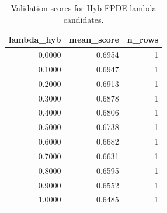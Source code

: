 \begin{table}[t]
\caption{Validation scores for Hyb-FPDE lambda candidates.}
\label{tab:lambda_distribution_computed}
\centering
\begin{tabular}{rrr}
\toprule
lambda\_hyb & mean\_score & n\_rows \\
\midrule
0.0000 & 0.6954 & 1 \\
0.1000 & 0.6947 & 1 \\
0.2000 & 0.6913 & 1 \\
0.3000 & 0.6878 & 1 \\
0.4000 & 0.6806 & 1 \\
0.5000 & 0.6738 & 1 \\
0.6000 & 0.6682 & 1 \\
0.7000 & 0.6631 & 1 \\
0.8000 & 0.6595 & 1 \\
0.9000 & 0.6552 & 1 \\
1.0000 & 0.6485 & 1 \\
\bottomrule
\end{tabular}

\end{table}

